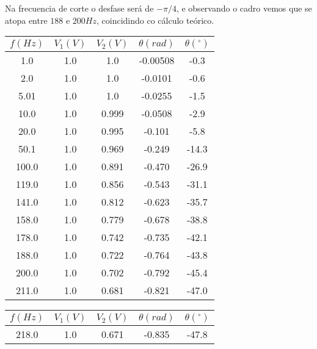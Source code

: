 \documentclass[12pt, a4paper, titlepage]{article}
\begin{document}
    Na frecuencia de corte o desfase será de $-\pi/4$, e observando o cadro vemos que se atopa entre $188$ e $200 Hz$, coincidindo co cálculo teórico.

    \begin{table}[H]
      \begin{minipage}{0.49\textwidth}
        \centering
        \begin{tabular}{|c|c|c|c|c|}
        \hline
        \rowcolor[HTML]{EFEFEF} 
        $f (Hz)$        & $V_1 (V)$  & $V_2 (V)$      & $\theta(rad)$       & $\theta (^{\circ})$   \\ \hline
        1.0      & 1.0 & 1.0     & -0.00508 & -0.3  \\ \hline
        2.0      & 1.0 & 1.0     & -0.0101  & -0.6  \\ \hline
        5.01     & 1.0 & 1.0     & -0.0255  & -1.5  \\ \hline
        10.0     & 1.0 & 0.999   & -0.0508  & -2.9  \\ \hline
        20.0     & 1.0 & 0.995   & -0.101   & -5.8  \\ \hline
        50.1     & 1.0 & 0.969   & -0.249   & -14.3 \\ \hline
        100.0    & 1.0 & 0.891   & -0.470    & -26.9 \\ \hline
        119.0    & 1.0 & 0.856   & -0.543   & -31.1 \\ \hline
        141.0    & 1.0 & 0.812   & -0.623   & -35.7 \\ \hline
        158.0    & 1.0 & 0.779   & -0.678   & -38.8 \\ \hline
        178.0    & 1.0 & 0.742   & -0.735   & -42.1 \\ \hline
        188.0    & 1.0 & 0.722   & -0.764   & -43.8 \\ \hline
        200.0    & 1.0 & 0.702   & -0.792   & -45.4 \\ \hline
        211.0    & 1.0 & 0.681   & -0.821   & -47.0 \\ \hline
        \end{tabular}
      \end{minipage}
      \begin{minipage}{0.49\textwidth}
        \centering
        \begin{tabular}{|c|c|c|c|c|}
        \hline
        \rowcolor[HTML]{EFEFEF} 
        $f (Hz)$        & $V_1 (V)$  & $V_2 (V)$      & $\theta(rad)$       & $\theta (^{\circ})$   \\ \hline
        218.0    & 1.0 & 0.671   & -0.835   & -47.8 \\ \hline

\end{tabular}
\end{minipage}
\end{table}
\end{document}
